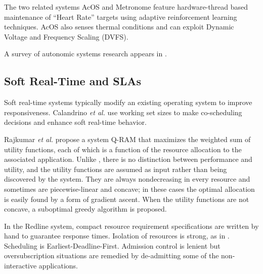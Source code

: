 %
%
The two related systems AcOS\cite{AcOS} and Metronome\cite{Metronome} feature hardware-thread based maintenance of ``Heart Rate''
targets using adaptive reinforcement learning techniques.
AcOS also senses thermal conditions and can exploit Dynamic Voltage and Frequency Scaling (DVFS).

A survey of autonomic systems research appears in \cite{1380585}.

\subsection*{Soft Real-Time and SLAs}
Soft real-time systems typically modify an existing operating system to improve responsiveness.
Calandrino \emph{et al.}\cite{unc} use working set sizes to make co-scheduling decisions and enhance soft real-time behavior.

%
Rajkumar \emph{et al.}\cite{828990} propose a system Q-RAM that maximizes the weighted sum of utility functions,
each of which is a function of the resource allocation to the associated application.
Unlike \pacora, there is no distinction between performance and utility, and
the utility functions are assumed as input rather than being discovered by the system.
They are always nondecreasing in every resource and sometimes are piecewise-linear and concave;
in these cases the optimal allocation is easily found by a form of gradient ascent.
When the utility functions are not concave, a suboptimal greedy algorithm is proposed.

%
In the Redline system\cite{Redline}, compact resource requirement specifications are written by hand to guarantee response times.
Isolation of resources is strong, as in \pacora.  Scheduling is Earliest-Deadline-First.
Admission control is lenient but oversubscription situations are remedied by de-admitting some of the non-interactive applications.

